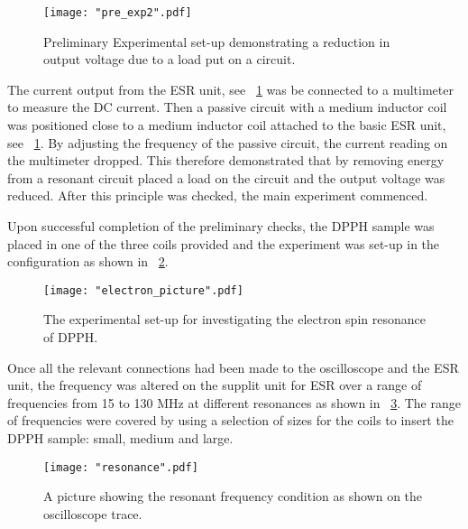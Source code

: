 \documentclass{article}
\newcommand{\figref}[2][\figurename~]{#1\ref{#2}}
\begin{document}
\begin{figure}[h]
\centering
\texttt{[image: "pre\_exp2".pdf]}
\caption{Preliminary Experimental set-up demonstrating a reduction in output voltage due to a load put on a circuit.}
\label{fig:pre_exp2}
\end{figure}

\vspace{2mm}
\noindent
The current output from the ESR unit, see \figref{fig:pre_exp2} was be connected to a multimeter to measure the DC current. Then a passive circuit with a medium inductor coil was positioned close to a medium inductor coil attached to the basic ESR unit, see \figref{fig:pre_exp2}. By adjusting the frequency of the passive circuit, the current reading on the multimeter dropped. This therefore demonstrated that by removing energy from a resonant circuit placed a load on the circuit and the output voltage was reduced. After this principle was checked, the main experiment commenced.

\vspace{2mm}
\noindent
Upon successful completion of the preliminary checks, the DPPH sample was placed in one of the three coils provided and the experiment was set-up in the configuration as shown in \figref{fig:electron_picture}. 

\begin{figure}[h]
\centering
\texttt{[image: "electron\_picture".pdf]}
\caption{The experimental set-up for investigating the electron spin resonance of DPPH.}
\label{fig:electron_picture}
\end{figure}

\vspace{2mm}
\noindent
Once all the relevant connections had been made to the oscilloscope and the ESR unit, the frequency was altered on the supplit unit for ESR over a range of frequencies from 15 to 130 MHz \cite{Paper02} at different resonances as shown in \figref{fig:resonance}. The range of frequencies were covered by using a selection of sizes for the coils to insert the DPPH sample: small, medium and large.

\begin{figure}[h]
\centering
\texttt{[image: "resonance".pdf]}
\caption{A picture showing the resonant frequency condition as shown on the oscilloscope trace.}
\label{fig:resonance}
\end{figure}
\end{document}
